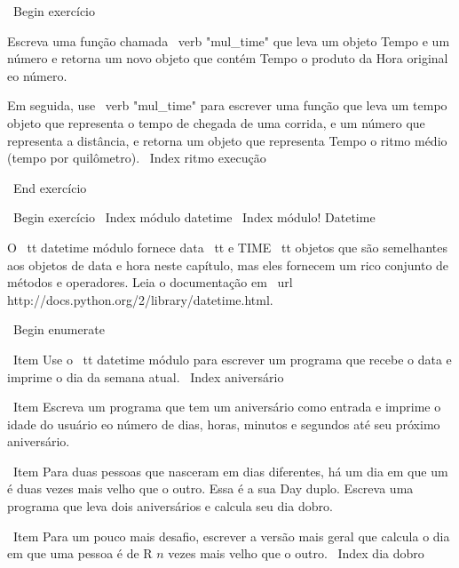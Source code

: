 \documentclass[10pt]{book}
\begin{document}
\begin {itemize}
{{{{{{{{{{{{{{\ Begin {} exercício

Escreva uma função chamada \ verb "mul_time" que leva um objeto Tempo
e um número e retorna um novo objeto que contém Tempo
o produto da Hora original eo número.

Em seguida, use \ verb "mul_time" para escrever uma função que leva um tempo
objeto que representa o tempo de chegada de uma corrida, e um número
que representa a distância, e retorna um objeto que representa Tempo
o ritmo médio (tempo por quilômetro).
\ Index {ritmo execução}

\ End {} exercício





\ Begin {} exercício
\ Index {módulo datetime}
\ Index {módulo! Datetime}

O {\ tt datetime} módulo fornece {data \ tt} e {TIME \ tt} objetos
que são semelhantes aos objetos de data e hora neste capítulo, mas
eles fornecem um rico conjunto de métodos e operadores. Leia o
documentação em \ url {http://docs.python.org/2/library/datetime.html}.

\ Begin {enumerate}

\ Item Use o {\ tt datetime} módulo para escrever um programa que recebe o
  data e imprime o dia da semana atual.
\ Index {aniversário}

\ Item Escreva um programa que tem um aniversário como entrada e imprime o
  idade do usuário eo número de dias, horas, minutos e segundos até
  seu próximo aniversário.

\ Item Para duas pessoas que nasceram em dias diferentes, há um dia em que um
  é duas vezes mais velho que o outro. Essa é a sua Day duplo. Escreva uma
  programa que leva dois aniversários e calcula seu dia dobro.

\ Item Para um pouco mais desafio, escrever a versão mais geral que
  calcula o dia em que uma pessoa é de R $ n $ vezes mais velho que o outro.
\ Index {dia dobro}

}}}}}}}}}}}}}}
\end{itemize}
\end{document}
